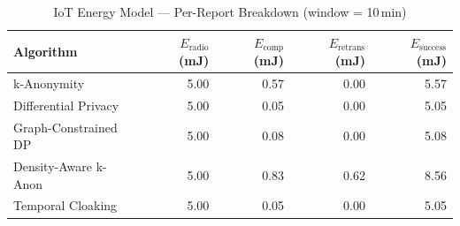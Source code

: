 \begin{table}[t]
\centering
\caption{IoT Energy Model — Per-Report Breakdown (window = 10\,min)}
\label{tab:energy}
\begin{tabular}{lrrrr}
\toprule
Algorithm & $E_\mathrm{radio}$ (mJ) & $E_\mathrm{comp}$ (mJ) & $E_\mathrm{retrans}$ (mJ) & $E_\mathrm{success}$ (mJ) \\
\midrule
  k-Anonymity & 5.00 & 0.57 & 0.00 & 5.57 \\
  Differential Privacy & 5.00 & 0.05 & 0.00 & 5.05 \\
  Graph-Constrained DP & 5.00 & 0.08 & 0.00 & 5.08 \\
  Density-Aware k-Anon & 5.00 & 0.83 & 0.62 & 8.56 \\
  Temporal Cloaking & 5.00 & 0.05 & 0.00 & 5.05 \\
\bottomrule
\end{tabular}
\end{table}
